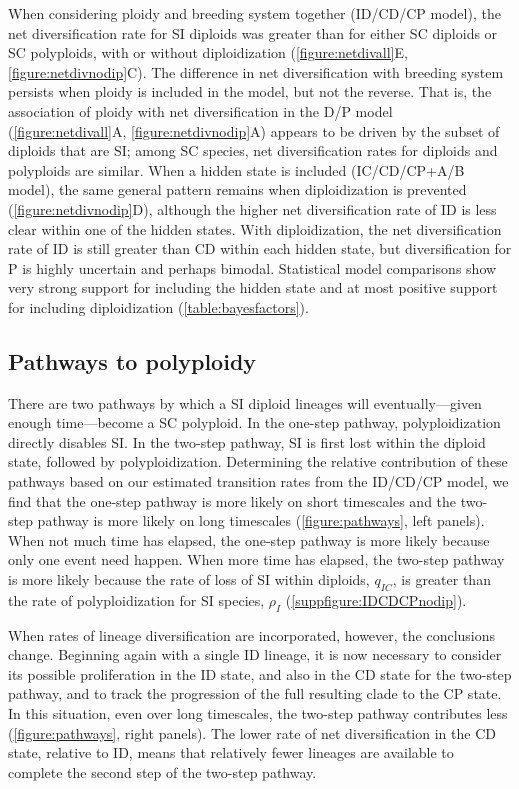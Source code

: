 When considering ploidy and breeding system together (ID/CD/CP model), the net diversification rate for SI diploids was greater than for either SC diploids or SC polyploids, with or without diploidization (\cref{figure:netdivall}E, \cref{figure:netdivnodip}C).
The difference in net diversification with breeding system persists when ploidy is included in the model, but not the reverse.
That is, the association of ploidy with net diversification in the D/P model (\cref{figure:netdivall}A, \cref{figure:netdivnodip}A) appears to be driven by the subset of diploids that are SI; among SC species, net diversification rates for diploids and polyploids are similar.
%
When a hidden state is included (IC/CD/CP+A/B model), the same general pattern remains when diploidization is prevented (\cref{figure:netdivnodip}D), although the higher net diversification rate of ID is less clear within one of the hidden states.
With diploidization, the net diversification rate of ID is still greater than CD within each hidden state, but diversification for P is highly uncertain and perhaps bimodal.
Statistical model comparisons show very strong support for including the hidden state and at most positive support for including diploidization (\cref{table:bayesfactors}).

\subsection{Pathways to polyploidy}

There are two pathways by which a SI diploid lineages will eventually---given enough time---become a SC polyploid.
In the one-step pathway, polyploidization directly disables SI.
In the two-step pathway, SI is first lost within the diploid state, followed by polyploidization.
Determining the relative contribution of these pathways based on our estimated transition rates from the ID/CD/CP model, we find that the one-step pathway is more likely on short timescales and the two-step pathway is more likely on long timescales (\cref{figure:pathways}, left panels).
When not much time has elapsed, the one-step pathway is more likely because only one event need happen.
When more time has elapsed, the two-step pathway is more likely because the rate of loss of SI within diploids, $q_{IC}$, is greater than the rate of polyploidization for SI species, $\rho_I$ (\cref{suppfigure:IDCDCPnodip}).

When rates of lineage diversification are incorporated, however, the conclusions change.
Beginning again with a single ID lineage, it is now necessary to consider its possible proliferation in the ID state, and also in the CD state for the two-step pathway, and to track the progression of the full resulting clade to the CP state.
In this situation, even over long timescales, the two-step pathway contributes less (\cref{figure:pathways}, right panels).
The lower rate of net diversification in the CD state, relative to ID, means that relatively fewer lineages are available to complete the second step of the two-step pathway.


